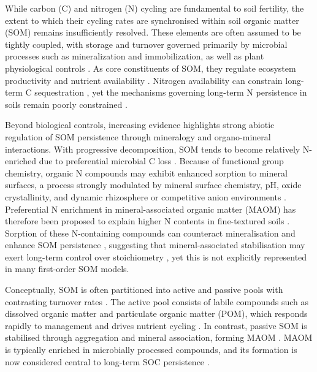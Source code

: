 \documentclass[bg, manuscript]{copernicus}
\begin{document}
\introduction  %
While carbon (C) and nitrogen (N) cycling are fundamental to soil fertility, the extent to which their cycling rates are synchronised within soil organic matter (SOM) remains insufficiently resolved. These elements are often assumed to be tightly coupled, with storage and turnover governed primarily by microbial processes such as mineralization and immobilization, as well as plant physiological controls \citep{Brust2019,Luo2026}. As core constituents of SOM, they regulate ecosystem productivity and nutrient availability \citep{Ma2023}. Nitrogen availability can constrain long-term C sequestration \citep{Luo2006}, yet the mechanisms governing long-term N persistence in soils remain poorly constrained \citep{Luo2026}.

Beyond biological controls, increasing evidence highlights strong abiotic regulation of SOM persistence through mineralogy and organo-mineral interactions. With progressive decomposition, SOM tends to become relatively N-enriched due to preferential microbial C loss \citep{Xu2013}. Because of functional group chemistry, organic N compounds may exhibit enhanced sorption to mineral surfaces, a process strongly modulated by mineral surface chemistry, pH, oxide crystallinity, and dynamic rhizosphere or competitive anion environments \citep{Kleber2021,Spohn2024,Keiluweit2015}. Preferential N enrichment in mineral-associated organic matter (MAOM) has therefore been proposed to explain higher N contents in fine-textured soils \citep{Spohn2020, Spohn2024}. Sorption of these N-containing compounds can counteract mineralisation and enhance SOM persistence \citep{Hemingway2019, Schmidt2011}, suggesting that mineral-associated stabilisation may exert long-term control over stoichiometry \citep{Koven2013}, yet this is not explicitly represented in many first-order SOM models.  

Conceptually, SOM is often partitioned into active and passive pools with contrasting turnover rates \citep{Paustian1992}. The active pool consists of labile compounds such as dissolved organic matter and particulate organic matter (POM), which responds rapidly to management and drives nutrient cycling \citep{Leuthold2023,Brady2017,Samson2020}. In contrast, passive SOM is stabilised through aggregation and mineral association, forming MAOM \citep{Dynarski2020, Trumbore1996}. MAOM is typically enriched in microbially processed compounds, and its formation is now considered central to long-term SOC persistence \citep{Cotrufo2013, Kallenbach2016, Lavallee2020}. 
\end{document}
